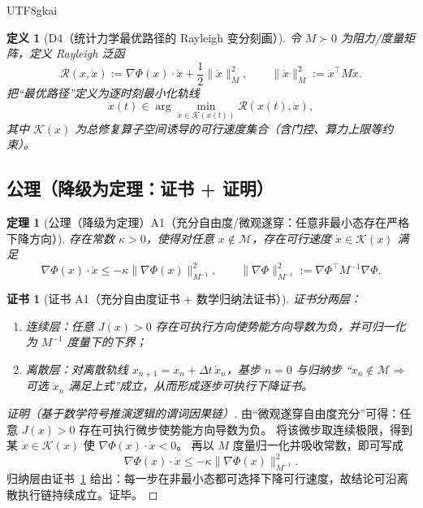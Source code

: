 \documentclass[12pt]{article}
\newtheorem{definition}{定义}[section]
\newtheorem{theorem}{定理}[section]
\newtheorem{Certificate}{证书}[section]
\begin{document}
\begin{CJK*}{UTF8}{gkai}
\begin{definition}[D4（统计力学最优路径的 Rayleigh 变分刻画）]
\label{def:tex28-ch11-d4}
令 $M\succ0$ 为阻力/度量矩阵，定义 Rayleigh 泛函\cite{onsager1931,ambrosio2008}
\[
  \mathcal{R}(x,\dot x):=\nabla\Phi(x)\cdot\dot x+\frac12\|\dot x\|_{M}^{2},
  \qquad
  \|\dot x\|_{M}^{2}:=\dot x^\top M\dot x.
\]
把“最优路径”定义为逐时刻最小化轨线
\[
  \dot x(t)\in\arg\min_{\dot x\in\mathcal{K}(x(t))}\mathcal{R}(x(t),\dot x),
\]
其中 $\mathcal{K}(x)$ 为总修复算子空间诱导的可行速度集合（含门控、算力上限等约束）。
\end{definition}

\subsection{公理（降级为定理：证书 + 证明）}
\label{subsec:tex28-ch11-axioms}

\begin{theorem}[公理（降级为定理）A1（充分自由度/微观遂穿：任意非最小态存在严格下降方向）]
\label{thm:tex28-ch11-a1}
存在常数 $\kappa>0$，使得对任意 $x\notin\mathcal{M}$，存在可行速度 $\dot x\in\mathcal{K}(x)$ 满足
\[
  \nabla\Phi(x)\cdot\dot x
  \le
  -\kappa\|\nabla\Phi(x)\|_{M^{-1}}^{2},
  \qquad
  \|\nabla\Phi\|_{M^{-1}}^{2}:=\nabla\Phi^\top M^{-1}\nabla\Phi.
\]
\end{theorem}

\begin{Certificate}[证书 A1（充分自由度证书 + 数学归纳法证书）]
\label{cert:tex28-ch11-a1}
证书分两层：
\begin{enumerate}
  \item 连续层：任意 $J(x)>0$ 存在可执行方向使势能方向导数为负，并可归一化为 $M^{-1}$ 度量下的下界；
  \item 离散层：对离散轨线 $x_{n+1}=x_n+\Delta t\,\dot x_n$，基步 $n=0$ 与归纳步
  “$x_n\notin\mathcal{M}\Rightarrow$ 可选 $\dot x_n$ 满足上式”成立，从而形成逐步可执行下降证书。
\end{enumerate}
\end{Certificate}

\begin{proof}[证明（基于数学符号推演逻辑的谓词因果链）]
由“微观遂穿自由度充分”可得：任意 $J(x)>0$ 存在可执行微步使势能方向导数为负。
将该微步取连续极限，得到某 $\dot x\in\mathcal{K}(x)$ 使 $\nabla\Phi(x)\cdot\dot x<0$。
再以 $M$ 度量归一化并吸收常数，即可写成
\[
  \nabla\Phi(x)\cdot\dot x
  \le
  -\kappa\|\nabla\Phi(x)\|_{M^{-1}}^{2}.
\]
归纳层由证书~\ref{cert:tex28-ch11-a1} 给出：每一步在非最小态都可选择下降可行速度，故结论可沿离散执行链持续成立。证毕。
\end{proof}


\end{CJK*}
\end{document}
